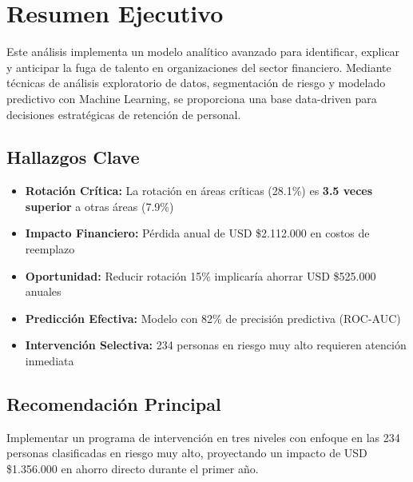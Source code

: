 \documentclass[11pt,a4paper,twoside]{article}
\begin{document}
\section*{Resumen Ejecutivo}

Este análisis implementa un modelo analítico avanzado para identificar, explicar y anticipar la fuga de talento en organizaciones del sector financiero. Mediante técnicas de análisis exploratorio de datos, segmentación de riesgo y modelado predictivo con Machine Learning, se proporciona una base data-driven para decisiones estratégicas de retención de personal.

\subsection*{Hallazgos Clave}

\begin{itemize}
    \item \textbf{Rotación Crítica:} La rotación en áreas críticas (28.1\%) es \textbf{3.5 veces superior} a otras áreas (7.9\%)
    \item \textbf{Impacto Financiero:} Pérdida anual de USD \$2.112.000 en costos de reemplazo
    \item \textbf{Oportunidad:} Reducir rotación 15\% implicaría ahorrar USD \$525.000 anuales
    \item \textbf{Predicción Efectiva:} Modelo con 82\% de precisión predictiva (ROC-AUC)
    \item \textbf{Intervención Selectiva:} 234 personas en riesgo muy alto requieren atención inmediata
\end{itemize}

\subsection*{Recomendación Principal}

Implementar un programa de intervención en tres niveles con enfoque en las 234 personas clasificadas en riesgo muy alto, proyectando un impacto de USD \$1.356.000 en ahorro directo durante el primer año.

\newpage

\tableofcontents
\newpage

\end{document}
